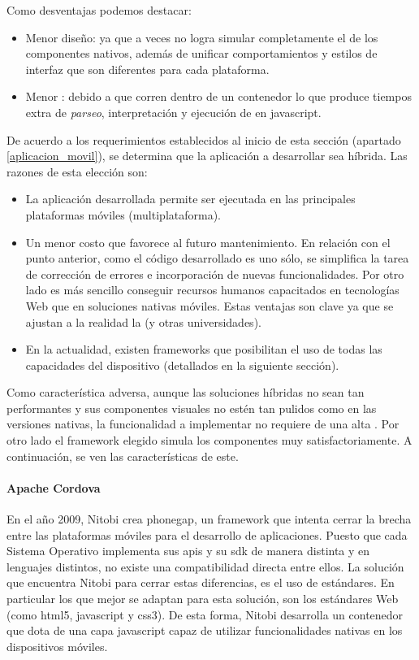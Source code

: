 Como desventajas podemos destacar:
\begin{itemize}
\item Menor diseño: ya que a veces no logra simular completamente el  de los componentes nativos, además de unificar comportamientos y estilos de interfaz que son diferentes para cada plataforma.
\item Menor : debido a que corren dentro de un contenedor lo que produce tiempos extra de \textit{parseo}, interpretación y ejecución de  en \gls{javascript}.
\end{itemize}

De acuerdo a los requerimientos establecidos al inicio de esta sección (apartado \ref{aplicacion_movil}), se determina que la aplicación a desarrollar sea híbrida. Las razones de esta elección son: 
\begin{itemize}
\item La aplicación desarrollada permite ser ejecutada en las principales plataformas móviles (multiplataforma).
\item Un menor costo que favorece al futuro mantenimiento. En relación con el punto anterior, como el código desarrollado es uno sólo, se simplifica la tarea de corrección de errores e incorporación de nuevas funcionalidades. Por otro lado es más sencillo conseguir recursos humanos capacitados en tecnologías Web que en soluciones nativas móviles. Estas ventajas son clave ya que se ajustan a la realidad la \unlp (y otras universidades).
\item En la actualidad, existen \gls{framework}s que posibilitan el uso de todas las capacidades del dispositivo (detallados en la siguiente sección).
\end{itemize} 

Como característica adversa, aunque las soluciones híbridas no sean tan performantes y sus componentes visuales no estén tan pulidos como en las versiones nativas, la funcionalidad a implementar no requiere de una alta . Por otro lado el \gls{framework} elegido simula los componentes muy satisfactoriamente. A continuación, se ven las características de este.

\paragraph{Apache Cordova}
\label{cordova}

En el año 2009, Nitobi crea \gls{phonegap}, un \gls{framework} que intenta cerrar la brecha entre las plataformas móviles para el desarrollo de aplicaciones. Puesto que cada Sistema Operativo implementa sus \glspl{api} y su \gls{sdk} de manera distinta y en lenguajes distintos, no existe una compatibilidad directa entre ellos. La solución que encuentra Nitobi para cerrar estas diferencias, es el uso de estándares. En particular los que mejor se adaptan para esta solución, son los estándares Web (como \gls{html}5, \gls{javascript} y \gls{css}3). De esta forma, Nitobi desarrolla un contenedor que dota de una capa \gls{javascript} capaz de utilizar funcionalidades nativas en los dispositivos móviles.

